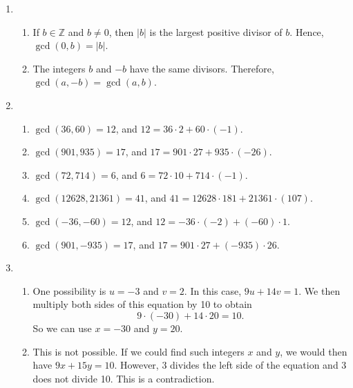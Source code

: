 \begin{enumerate}
\item \begin{enumerate}
\item If $b \in \mathbb{Z}$ and $b \ne 0$, then $\left| b \right|$ is the largest positive divisor of $b$.  Hence, $\gcd \left( 0, b \right) = \left|b \right|$.

\item The integers $b$ and $-b$ have the same divisors.  Therefore, \\
$\gcd \left( a, -b \right) = \gcd \left( a, b \right)$.
\end{enumerate}



\item \begin{enumerate}
\item $\gcd \left( {36, 60} \right) = 12$, and 
$12 = 36 \cdot 2 + 60 \cdot \left( { - 1} \right)$.

\item $\gcd \left( {901, 935} \right) = 17$, and 
$17 = 901 \cdot 27 + 935 \cdot \left( { - 26} \right)$.

\item $\gcd \left( 72, 714 \right) = 6$, and  
$6 = 72 \cdot 10 + 714 \cdot \left( -1 \right) $.

\item $\gcd \left( 12628, 21361 \right) = 41$, and 
$41 = 12628 \cdot 181 + 21361 \cdot \left( 107 \right)$.

\item $\gcd \left( -36, -60 \right) = 12$, and  
$12 = -36 \cdot (-2) + (-60) \cdot 1 $.

\item $\gcd \left( 901, -935 \right) = 17$, and  
$17 = 901 \cdot 27 + (-935) \cdot 26 $.
\end{enumerate}



\item \begin{enumerate}
\item One possibility is $u = -3$ and $v = 2$.  In this case, $9u + 14v = 1$.  We then multiply both sides of this equation by 10 to obtain
\[
9 \cdot (-30) + 14 \cdot 20 = 10.
\]
So we can use $x = -30$ and $y = 20$.

\item This is not possible.  If we could find such integers $x$ and $y$, we would then have 
$9x + 15y = 10$.  However, 3 divides the left side of the equation and 3 does not divide 10.  This is a contradiction.


\end{enumerate}
\end{enumerate}
